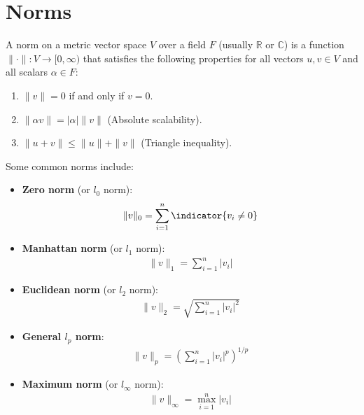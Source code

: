 \section{Norms}
\label{sec:norms}

\begin{def*}
A norm on a metric vector space \(V\) over a field \(F\) (usually \(\mathbb{R}\) or \(\mathbb{C}\)) is a function \(\|\cdot\|: V \rightarrow [0, \infty)\) that satisfies the following properties for all vectors \(u, v \in V\) and all scalars \(\alpha \in F\):
\begin{enumerate}
    \item \(\|v\| = 0\) if and only if \(v = 0\).
    \item \(\|\alpha v\| = |\alpha| \|v\|\) (Absolute scalability).
    \item \(\|u + v\| \leq \|u\| + \|v\|\) (Triangle inequality).
\end{enumerate}
\end{def*}

Some common norms include:

\begin{itemize}
    \item \textbf{Zero norm} (or \(l_0\) norm):
    \begin{align*}
        \|v\|_0 = \sum_{i=1}^n \indicator{v_i \neq 0}
    \end{align*}

    \item \textbf{Manhattan norm} (or \(l_1\) norm):
    \begin{align*}
        \|v\|_1 = \sum_{i=1}^n |v_i|
    \end{align*}

    \item \textbf{Euclidean norm} (or \(l_2\) norm):
    \begin{align*}
        \|v\|_2 = \sqrt{\sum_{i=1}^n |v_i|^2}
    \end{align*}
    
    \item \textbf{General \(l_p\) norm}:
    \begin{align*}
        \|v\|_p = \left(\sum_{i=1}^n |v_i|^p\right)^{1/p}
    \end{align*}

    \item \textbf{Maximum norm} (or \(l_\infty\) norm):
    \begin{align*}
        \|v\|_\infty = \max_{i=1}^n |v_i|
    \end{align*}
\end{itemize}